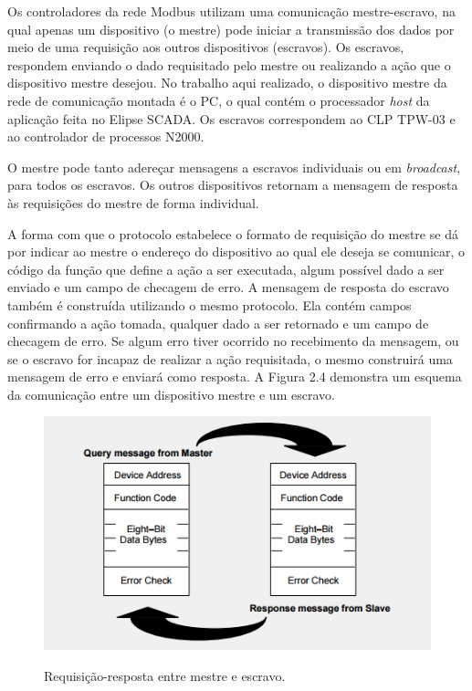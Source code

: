 Os controladores da rede Modbus utilizam uma comunicação mestre-escravo, na qual apenas um dispositivo (o mestre) pode iniciar a transmissão dos dados por meio de uma requisição aos outros dispositivos (escravos). Os escravos, respondem enviando o dado requisitado pelo mestre ou realizando a ação que o dispositivo mestre desejou. No trabalho aqui realizado, o dispositivo mestre da rede de comunicação montada é o PC, o qual contém o processador \textit{host} da aplicação feita no Elipse SCADA. Os escravos correspondem ao CLP TPW-03 e ao controlador de processos N2000.

O mestre pode tanto adereçar mensagens a escravos individuais ou em \textit{broadcast}, para todos os escravos. Os outros dispositivos retornam a mensagem de resposta às requisições do mestre de forma individual. 

A forma com que o protocolo estabelece o formato de requisição do mestre se dá por indicar ao mestre o endereço do dispositivo ao qual ele deseja se comunicar, o código da função que define a ação a ser executada, algum possível dado a ser enviado e um campo de checagem de erro. A mensagem de resposta do escravo também é construída utilizando o mesmo protocolo. Ela contém campos confirmando a ação tomada, qualquer dado a ser retornado e um campo de checagem de erro. Se algum erro tiver ocorrido no recebimento da mensagem, ou se o escravo for incapaz de realizar a ação requisitada, o mesmo construirá uma mensagem de erro e enviará como resposta. A Figura 2.4 demonstra um esquema da comunicação entre um dispositivo mestre e um escravo.

\begin{figure}[h!]
  \center
  \includegraphics[scale=1.0]{QueryResponse.png}
  \label{fig:QueryResponse}
  \caption{Requisição-resposta entre mestre e escravo.}\cite{modbus1996manual}
\end{figure}
